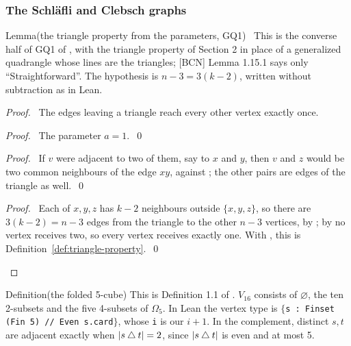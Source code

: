 \subsubsection*{The Schl\"afli and Clebsch graphs}

\begin{namedresult}{Lemma}{(the triangle property from the parameters, GQ1)}\label{lem:414-GQ1}
 \new\ This is the converse half of GQ1 of , with the triangle
 property of Section 2 in place of a generalized quadrangle whose lines are the triangles;
 [BCN] Lemma 1.15.1 says only ``Straightforward''. The hypothesis is $n-3=3(k-2)$, written
 without subtraction as in Lean.
\end{namedresult}
\begin{proof}
 \pfsketch\ The edges leaving a triangle reach every other vertex exactly once.
 \begin{proof}\pf\ The parameter $a=1$.~\qed\end{proof}
 \begin{proof}\pf\ If $v$ were adjacent to two of them, say to $x$ and $y$, then $v$ and $z$ would
  be two common neighbours of the edge $xy$, against ; the other pairs are
  edges of the triangle as well.~\qed\end{proof}
 \qedstep
 \begin{proof}\pf\ Each of $x,y,z$ has $k-2$ neighbours outside $\{x,y,z\}$, so there are
  $3(k-2)=n-3$ edges from the triangle to the other $n-3$ vertices, by ; by
   no vertex receives two, so every vertex receives exactly one. With
  , this is Definition~\ref{def:triangle-property}.~\qed\end{proof}
\end{proof}

\begin{namedresult}{Definition}{(the folded 5-cube)}\label{def:414-folded}
 \uses{}
 This is Definition 1.1 of . $V_{16}$ consists of $\varnothing$,
 the ten 2-subsets and the five 4-subsets of $\Omega_5$. In Lean the vertex type is
 \texttt{$\{$s : Finset (Fin 5) // Even s.card$\}$}, whose \texttt{i} is our $i+1$. In the complement, distinct $s,t$ are adjacent
 exactly when $|s\mathbin{\triangle} t|=2$, since $|s\mathbin{\triangle} t|$ is even and at most 5.
\end{namedresult}


